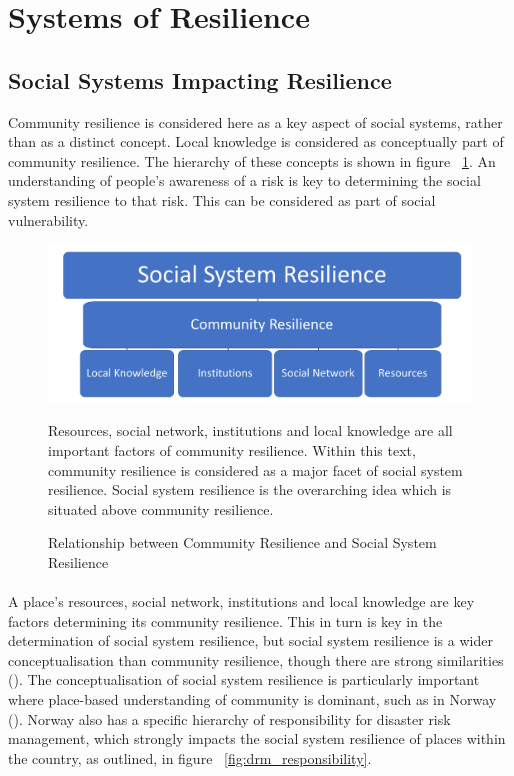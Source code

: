 \section{Systems of Resilience }

\subsection{Social Systems Impacting Resilience}
Community resilience is considered here as a key aspect of social systems, rather than as a distinct concept. Local knowledge is considered as conceptually part of community resilience. The hierarchy of these concepts is shown in figure ~\ref{fig:social_resilience}. An understanding of people's awareness of a risk is key to determining the social system resilience to that risk. This can be considered as part of social vulnerability.

\begin{figure}[h]
    \centering
    \includegraphics[width=1\textwidth]{fig_theory/new_social_system.png}
    \caption{Relationship between Community Resilience and Social System Resilience}{Resources, social network, institutions and local knowledge are all important factors of community resilience. Within this text, community resilience is considered as a major facet of social system resilience. Social system resilience is the overarching idea which is situated above community resilience.}
    \label{fig:social_resilience}
\end{figure}
\paragraph{}

A place's resources, social network, institutions and local knowledge are key factors determining its community resilience. This in turn is key in the determination of social system resilience, but social system resilience is a wider conceptualisation than community resilience, though there are strong similarities (\cite{cutter_community_2020}). The conceptualisation of social system resilience is particularly important where place-based understanding of community is dominant, such as in Norway (\cite{rasanen_conceptualizing_2020}). Norway also has a specific hierarchy of responsibility for disaster risk management, which strongly impacts the social system resilience of places within the country, as outlined, in figure ~\ref{fig:drm_responsibility}.


